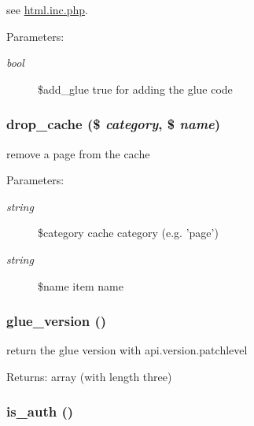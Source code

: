 see \hyperlink{html_8inc_8php}{html.inc.php}. \begin{Desc}
\item[Parameters:]
\begin{description}
\item[{\em bool}]\$add\_\-glue true for adding the glue code \end{description}
\end{Desc}
\hypertarget{common_8inc_8php_7ca47f8aab349971cde2d4b02441cf41}{
\subsubsection[{drop\_\-cache}]{\setlength{\rightskip}{0pt plus 5cm}drop\_\-cache (\$ {\em category}, \/  \$ {\em name})}}
\label{common_8inc_8php_7ca47f8aab349971cde2d4b02441cf41}


remove a page from the cache

\begin{Desc}
\item[Parameters:]
\begin{description}
\item[{\em string}]\$category cache category (e.g. 'page') \item[{\em string}]\$name item name \end{description}
\end{Desc}
\hypertarget{common_8inc_8php_0d6d0da45f4adf6283bcccec9fd107e3}{
\subsubsection[{glue\_\-version}]{\setlength{\rightskip}{0pt plus 5cm}glue\_\-version ()}}
\label{common_8inc_8php_0d6d0da45f4adf6283bcccec9fd107e3}


return the glue version with api.version.patchlevel

\begin{Desc}
\item[Returns:]array (with length three) \end{Desc}
\hypertarget{common_8inc_8php_b3abbb2cd13e01231533e7cdc93da6db}{
\subsubsection[{is\_\-auth}]{\setlength{\rightskip}{0pt plus 5cm}is\_\-auth ()}}
\label{common_8inc_8php_b3abbb2cd13e01231533e7cdc93da6db}


